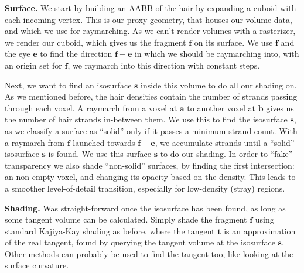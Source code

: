 \documentclass{egpubl}
\begin{document}

\noindent \textbf{Surface. } We start by building an AABB of the hair by expanding a cuboid with each incoming vertex. This is our proxy geometry, that houses our volume data, and which we use for raymarching. As we can't render volumes with a rasterizer, we render our cuboid, which gives us the fragment $\mathbf{f}$ on its surface. We use $\mathbf{f}$ and the eye $\mathbf{e}$ to find the direction $\mathbf{f} - \mathbf{e}$ in which we should be raymarching into, with an origin set for $\mathbf{f}$, we raymarch into this direction with constant steps.

Next, we want to find an isosurface $\mathbf{s}$ inside this volume to do all our shading on. As we mentioned before, the hair densities contain the number of strands passing through each voxel. A raymarch from a voxel at $\mathbf{a}$ to another voxel at $\mathbf{b}$ gives us the number of hair strands in-between them. We use this to find the isosurface $\mathbf{s}$, as we classify a surface as ``solid'' only if it passes a minimum strand count. With a raymarch from $\mathbf{f}$ launched towards $\mathbf{f} - \mathbf{e}$, we accumulate strands until a ``solid'' isosurface $\mathbf{s}$ is found. We use this surface $\mathbf{s}$ to do our shading. In order to ``fake'' transparency we also shade ``non-solid'' surfaces, by finding the first intersection: an non-empty voxel, and changing its opacity based on the density. This leads to a smoother level-of-detail transition, especially for low-density (stray) regions.

\noindent \textbf{Shading. } Was straight-forward once the isosurface has been found, as long as some tangent volume can be calculated. Simply shade the fragment $\mathbf{f}$ using standard Kajiya-Kay shading as before, where the tangent $\mathbf{t}$ is an approximation of the real tangent, found by querying the tangent volume at the isosurface $\mathbf{s}$. Other methods can probably be used to find the tangent too, like looking at the surface curvature.

\end{document}

